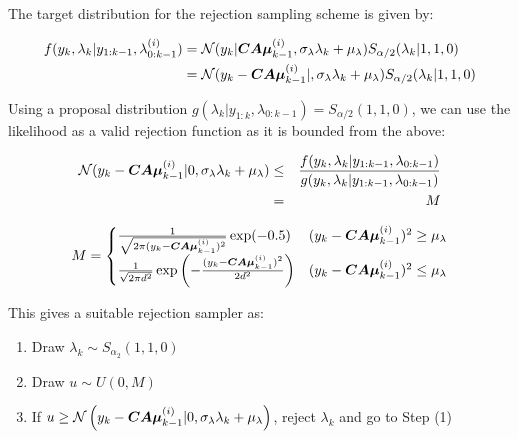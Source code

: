 \documentclass[../main.tex]{subfiles}
\begin{document}
The target distribution for the rejection sampling scheme is given by:

\begin{align}
f(y_k, \lambda_k | y_{1:k-1}, \lambda_{0:k-1}^{(i)}) & = \mathcal{N}(y_k | \bm{CA\mu}_{k-1}^{(i)} , \sigma_\lambda \lambda_k + \mu_\lambda) S_{\alpha/2} (\lambda_k | 1,1,0) \notag \\
& = \mathcal{N}(y_k - \bm{CA\mu}_{k-1}^{(i)} |  , \sigma_\lambda \lambda_k + \mu_\lambda) S_{\alpha/2} (\lambda_k | 1,1,0) \notag
\end{align}


%    
%    
%
%

Using a proposal distribution $g(\lambda_k | y_{1:k}, \lambda_{0:k-1}) = S_{\alpha/2}(1,1,0)$, we can use the likelihood as a valid rejection function as it is bounded from the above:

\begin{eqnarray}
\mathcal{N}(y_k - \bm{CA\mu}_{k-1}^{(i)} | 0, \sigma_\lambda \lambda_k + \mu_\lambda) & \leq & \frac{f(y_k, \lambda_k | y_{1:k-1}, \lambda_{0:k-1})}{g(y_k, \lambda_k | y_{1:k-1}, \lambda_{0:k-1})} \notag \\
& = & M \notag           
\end{eqnarray}

\begin{equation}
M = \begin{cases}
\frac{1}{\sqrt{2 \pi (y_k - \bm{CA\mu}_{k-1}^{(i)})^2}} \exp (-0.5) &  (y_k - \bm{CA\mu}_{k-1}^{(i)})^2 \geq \mu_\lambda \\
\frac{1}{\sqrt{2 \pi d^2}} \exp{ \left( -\frac{(y_k - \bm{CA\mu} _{k-1}^{(i)})^2}{2d^2} \right) } & (y_k - \bm{CA\mu}_{k-1}^{(i)})^2 \leq \mu_\lambda
\end{cases}
\end{equation}

This gives a suitable rejection sampler as:

\begin{enumerate}
	\item Draw $\lambda_k \sim S_{\alpha_2}(1,1,0)$
	\item Draw $ u \sim U ( 0, M )$
	\item If $u \geq \mathcal{N}\left( y_k - \bm{CA\mu}_{k-1}^{(i)} | 0, \sigma_\lambda \lambda_k + \mu_\lambda \right)$, reject $\lambda_k$ and go to Step (1)
\end{enumerate}
\end{document}
